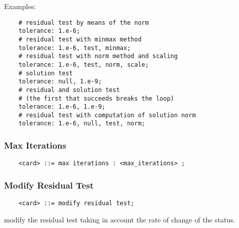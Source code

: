 \noindent
Examples:
\begin{verbatim}
    # residual test by means of the norm
    tolerance: 1.e-6;
    # residual test with minmax method
    tolerance: 1.e-6, test, minmax;
    # residual test with norm method and scaling
    tolerance: 1.e-6, test, norm, scale;
    # solution test
    tolerance: null, 1.e-9;
    # residual and solution test
    # (the first that succeeds breaks the loop)
    tolerance: 1.e-6, 1.e-9;
    # residual test with computation of solution norm
    tolerance: 1.e-6, null, test, norm;
\end{verbatim}

\subsubsection{Max Iterations}
\begin{verbatim}
    <card> ::= max iterations : <max_iterations> ;
\end{verbatim}

\subsubsection{Modify Residual Test}
\begin{verbatim}
    <card> ::= modify residual test;
\end{verbatim}
modify the residual test taking in account the rate of change of the status.


